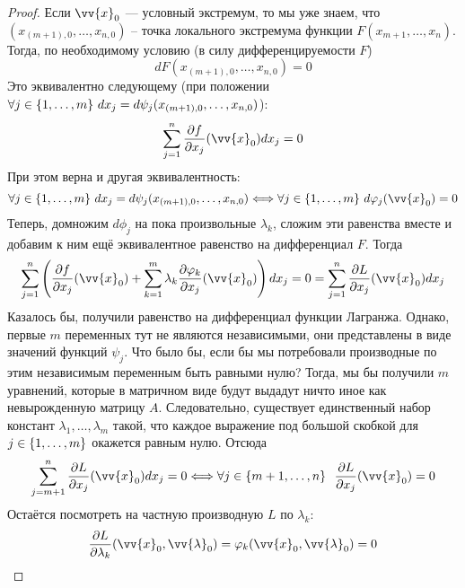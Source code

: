 \begin{proof}
	Если $\vv{x}_0$ --- условный экстремум, то мы уже знаем, что $(x_{(m + 1), 0}, \ldots, x_{n, 0})$ -- точка локального экстремума функции $F(x_{m + 1}, \ldots, x_n)$. Тогда, по необходимому условию (в силу дифференцируемости $F$)
	\[
		dF(x_{(m + 1), 0}, \ldots, x_{n, 0}) = 0
	\]
	Это эквивалентно следующему (при положении $\forall j \in \{1, \ldots, m\}\ dx_j = d\psi_j(x_{(m + 1), 0}, \ldots, x_{n, 0})$):
	\[
		\sum_{j = 1}^n \pd{f}{x_j} (\vv{x}_0) dx_j = 0
	\]
	При этом верна и другая эквивалентность:
	\[
		\forall j \in \range{m}\ dx_j = d\psi_j(x_{(m + 1), 0}, \ldots, x_{n, 0}) \Longleftrightarrow \forall j \in \range{m}\ d\phi_j(\vv{x}_0) = 0
	\]
	Теперь, домножим $d\phi_j$ на пока произвольные $\lambda_k$, сложим эти равенства вместе и добавим к ним ещё эквивалентное равенство на дифференциал $F$. Тогда
	\[
		\sum_{j = 1}^n \ps{\pd{f}{x_j}(\vv{x}_0) + \sum_{k = 1}^m \lambda_k \pd{\phi_k}{x_j}(\vv{x}_0)}dx_j = 0 = \sum_{j = 1}^n \pd{L}{x_j}(\vv{x}_0)dx_j
	\]
	Казалось бы, получили равенство на дифференциал функции Лагранжа. Однако, первые $m$ переменных тут не являются независимыми, они представлены в виде значений функций $\psi_j$. Что было бы, если бы мы потребовали производные по этим независимым переменным быть равными нулю? Тогда, мы бы получили $m$ уравнений, которые в матричном виде будут выдадут ничто иное как невырожденную матрицу $A$. Следовательно, существует единственный набор констант $\lambda_1, \ldots, \lambda_m$ такой, что каждое выражение под большой скобкой для $j \in \{1, \ldots, m\}$ окажется равным нулю. Отсюда
	\[
		\sum_{j = m + 1}^n \pd{L}{x_j} (\vv{x}_0) dx_j = 0 \Longleftrightarrow \forall j \in \{m + 1, \ldots, n\}\ \ \pd{L}{x_j}(\vv{x}_0) = 0
	\]
	Остаётся посмотреть на частную производную $L$ по $\lambda_k$:
	\[
		\pd{L}{\lambda_k}(\vv{x}_0, \vv{\lambda}_0) = \phi_k(\vv{x}_0, \vv{\lambda}_0) = 0
	\]
\end{proof}